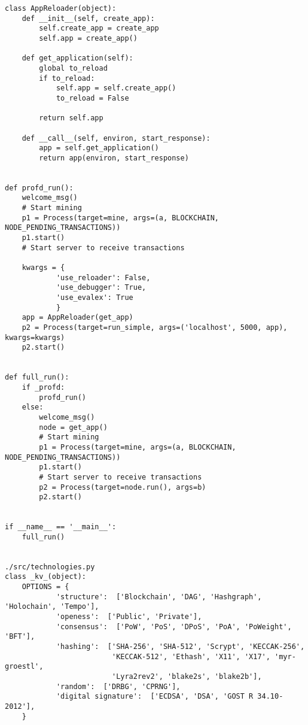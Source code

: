 \begin{lstlisting}
class AppReloader(object):
    def __init__(self, create_app):
        self.create_app = create_app
        self.app = create_app()

    def get_application(self):
        global to_reload
        if to_reload:
            self.app = self.create_app()
            to_reload = False

        return self.app

    def __call__(self, environ, start_response):
        app = self.get_application()
        return app(environ, start_response)


def profd_run():
    welcome_msg()
    # Start mining
    p1 = Process(target=mine, args=(a, BLOCKCHAIN, NODE_PENDING_TRANSACTIONS))
    p1.start()
    # Start server to receive transactions

    kwargs = {
            'use_reloader': False,
            'use_debugger': True,
            'use_evalex': True
            }
    app = AppReloader(get_app)
    p2 = Process(target=run_simple, args=('localhost', 5000, app), kwargs=kwargs)
    p2.start()


def full_run():
    if _profd:
        profd_run()
    else:
        welcome_msg()
        node = get_app()
        # Start mining
        p1 = Process(target=mine, args=(a, BLOCKCHAIN, NODE_PENDING_TRANSACTIONS))
        p1.start()
        # Start server to receive transactions
        p2 = Process(target=node.run(), args=b)
        p2.start()


if __name__ == '__main__':
    full_run()


./src/technologies.py
class _kv_(object):
    OPTIONS = {
            'structure':  ['Blockchain', 'DAG', 'Hashgraph', 'Holochain', 'Tempo'],
            'openess':  ['Public', 'Private'],
            'consensus':  ['PoW', 'PoS', 'DPoS', 'PoA', 'PoWeight', 'BFT'],
            'hashing':  ['SHA-256', 'SHA-512', 'Scrypt', 'KECCAK-256',
                         'KECCAK-512', 'Ethash', 'X11', 'X17', 'myr-groestl',
                         'Lyra2rev2', 'blake2s', 'blake2b'],
            'random':  ['DRBG', 'CPRNG'],
            'digital signature':  ['ECDSA', 'DSA', 'GOST R 34.10-2012'],
    }


\end{lstlisting}
